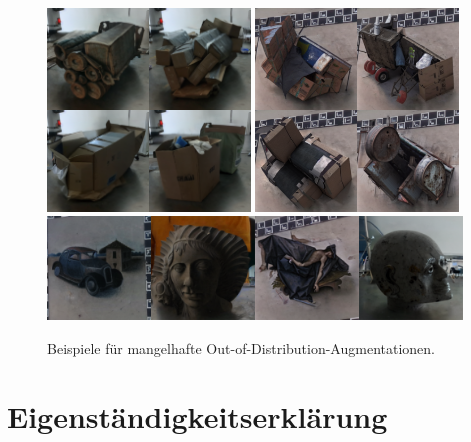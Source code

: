\begin{figure}[h]
  \centering
  \includegraphics[width=0.48\textwidth]{figure_results_ood-augs_bad_1.png}%
  \hspace{0.02\textwidth}\includegraphics[width=0.48\textwidth]{figure_results_ood-augs_bad_2.png}\vspace{0.01\textwidth}
  \includegraphics[width=0.98\textwidth]{figure_results_ood-augs_bad_4.png}
  \caption{Beispiele für mangelhafte Out-of-Distribution-Augmentationen.}
  \label{fig:ood-augs-bad}
\end{figure}

\clearpage

\thispagestyle{empty}
\section*{Eigenständigkeitserklärung}

